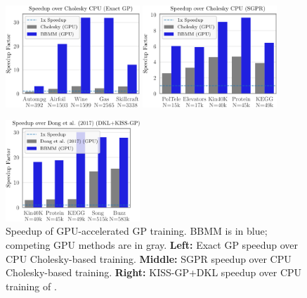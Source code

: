 \begin{figure}[t]
  \centering
  \includegraphics[width=0.45\textwidth]{figures/bbmm_speedup_exact_gp.pdf}
  \quad
  \includegraphics[width=0.45\textwidth]{figures/bbmm_speedup_sgpr.pdf}
  \vspace{1em}

  \includegraphics[width=0.45\textwidth]{figures/bbmm_speedup_dkl+kiss-gp.pdf}
  \caption[Speedup of GPU-accelerated GP training.]{
    Speedup of GPU-accelerated GP training.
    BBMM is in blue; competing GPU methods are in gray.
    {\bf Left:} Exact GP speedup over CPU Cholesky-based training.
    {\bf Middle:} SGPR \cite{titsias2009variational,hensman2013gaussian} speedup over CPU Cholesky-based training.
    {\bf Right:} KISS-GP+DKL \cite{wilson2015kernel,wilson2016deep} speedup over CPU training of \citet{dong2017scalable}.
    \label{fig:timing_results}
  }
\end{figure}
%
